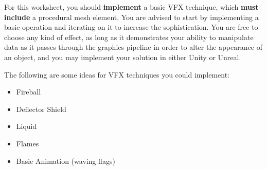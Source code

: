 \documentclass{../../../fal_assignment}
\begin{document}
For this worksheet, you should \textbf{implement} a basic VFX technique, which \textbf{must include} a procedural mesh element. You are advised to start by implementing a basic operation and iterating on it to increase the sophistication. You are free to choose any kind of effect, as long as it demonstrates your ability to manipulate data as it passes through the graphics pipeline in order to alter the appearance of an object, and you may implement your solution in either Unity or Unreal.

The following are some ideas for VFX techniques you could implement:

\begin{itemize}
	\item Fireball
	\item Deflector Shield 
	\item Liquid
	\item Flames
	\item Basic Animation (waving flags)
\end{itemize}
\end{document}
